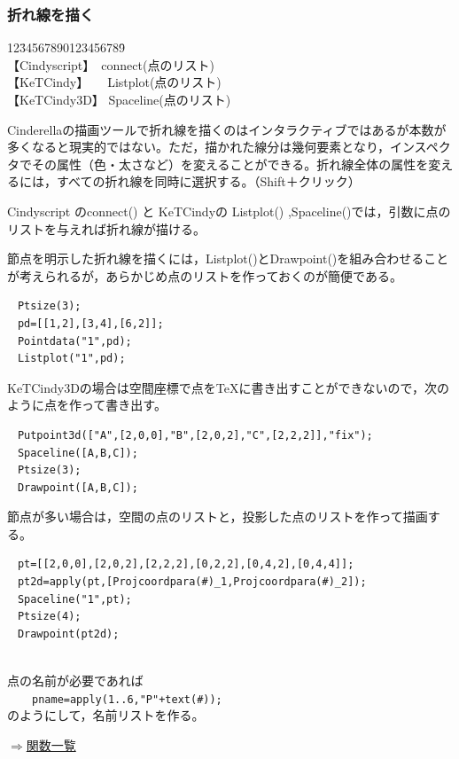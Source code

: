 \documentclass[papersize,a4paper,12pt,uplatex]{jsarticle}
\begin{document}
\subsubsection{折れ線を描く}

\begin{tabbing}
12\=34567890123456789\=\kill\\

\>【Cindyscript】　\>connect(点のリスト)\\
\>【KeTCindy】　　\>Listplot(点のリスト)\\
\>【KeTCindy3D】  \>Spaceline(点のリスト)\\
\end{tabbing}

Cinderellaの描画ツールで折れ線を描くのはインタラクティブではあるが本数が多くなると現実的ではない。ただ，描かれた線分は幾何要素となり，インスペクタでその属性（色・太さなど）を変えることができる。折れ線全体の属性を変えるには，すべての折れ線を同時に選択する。（Shift＋クリック）

Cindyscript のconnect() と KeTCindyの Listplot() ,Spaceline()では，引数に点のリストを与えれば折れ線が描ける。

節点を明示した折れ線を描くには，Listplot()とDrawpoint()を組み合わせることが考えられるが，あらかじめ点のリストを作っておくのが簡便である。
\begin{verbatim}
　Ptsize(3);
　pd=[[1,2],[3,4],[6,2]];
　Pointdata("1",pd);
　Listplot("1",pd);
\end{verbatim}

KeTCindy3Dの場合は空間座標で点をTeXに書き出すことができないので，次のように点を作って書き出す。
\begin{verbatim}
　Putpoint3d(["A",[2,0,0],"B",[2,0,2],"C",[2,2,2]],"fix");
　Spaceline([A,B,C]);
　Ptsize(3);
　Drawpoint([A,B,C]);
\end{verbatim}
節点が多い場合は，空間の点のリストと，投影した点のリストを作って描画する。
\begin{verbatim}
　pt=[[2,0,0],[2,0,2],[2,2,2],[0,2,2],[0,4,2],[0,4,4]];
　pt2d=apply(pt,[Projcoordpara(#)_1,Projcoordpara(#)_2]);
　Spaceline("1",pt);
　Ptsize(4);
　Drawpoint(pt2d);
\end{verbatim}
　　　　　　　\\

点の名前が必要であれば\\
　　\verb|pname=apply(1..6,"P"+text(#));|\\
のようにして，名前リストを作る。\\ 
\begin{flushright} \hyperlink{functionlist3d}{$\Rightarrow$関数一覧}\end{flushright}
\end{document}
